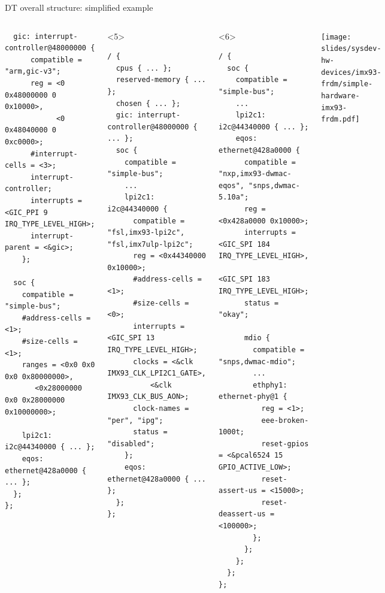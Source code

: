 \begin{frame}[fragile]{DT overall structure: simplified example}
\begin{columns}
\begin{onlyenv}
\begin{block}{}
\begin{verbatim}
  gic: interrupt-controller@48000000 {
      compatible = "arm,gic-v3";
      reg = <0 0x48000000 0 0x10000>,
            <0 0x48040000 0 0xc0000>;
      #interrupt-cells = <3>;
      interrupt-controller;
      interrupts = <GIC_PPI 9 IRQ_TYPE_LEVEL_HIGH>;
      interrupt-parent = <&gic>;
    };

  soc {
    compatible = "simple-bus";
    #address-cells = <1>;
    #size-cells = <1>;
    ranges = <0x0 0x0 0x0 0x80000000>,
       <0x28000000 0x0 0x28000000 0x10000000>;

    lpi2c1: i2c@44340000 { ... };
    eqos: ethernet@428a0000 { ... };
  };
};
\end{verbatim}
      \end{block}
    \end{onlyenv}
    \begin{onlyenv}<5>
      \begin{block}{}
\begin{verbatim}
/ {
  cpus { ... };
  reserved-memory { ... };
  chosen { ... };
  gic: interrupt-controller@48000000 { ... };
  soc {
    compatible = "simple-bus";
    ...
    lpi2c1: i2c@44340000 {
      compatible = "fsl,imx93-lpi2c", "fsl,imx7ulp-lpi2c";
      reg = <0x44340000 0x10000>;
      #address-cells = <1>;
      #size-cells = <0>;
      interrupts = <GIC_SPI 13 IRQ_TYPE_LEVEL_HIGH>;
      clocks = <&clk IMX93_CLK_LPI2C1_GATE>,
          <&clk IMX93_CLK_BUS_AON>;
      clock-names = "per", "ipg";
      status = "disabled";
    };
    eqos: ethernet@428a0000 { ... };
  };
};
\end{verbatim}
      \end{block}
    \end{onlyenv}
    \begin{onlyenv}<6>
      \begin{block}{}
\begin{verbatim}
/ {
  soc {
    compatible = "simple-bus";
    ...
    lpi2c1: i2c@44340000 { ... };
    eqos: ethernet@428a0000 {
      compatible = "nxp,imx93-dwmac-eqos", "snps,dwmac-5.10a";
      reg = <0x428a0000 0x10000>;
      interrupts = <GIC_SPI 184 IRQ_TYPE_LEVEL_HIGH>,
              <GIC_SPI 183 IRQ_TYPE_LEVEL_HIGH>;
      status = "okay";

      mdio {
        compatible = "snps,dwmac-mdio";
        ...
        ethphy1: ethernet-phy@1 {
          reg = <1>;
          eee-broken-1000t;
          reset-gpios = <&pcal6524 15 GPIO_ACTIVE_LOW>;
          reset-assert-us = <15000>;
          reset-deassert-us = <100000>;
        };
      };
    };
  };
};
\end{verbatim}
      \end{block}
    \end{onlyenv}
    \texttt{[image: slides/sysdev-hw-devices/imx93-frdm/simple-hardware-imx93-frdm.pdf]}
  \end{columns}
\end{frame}

